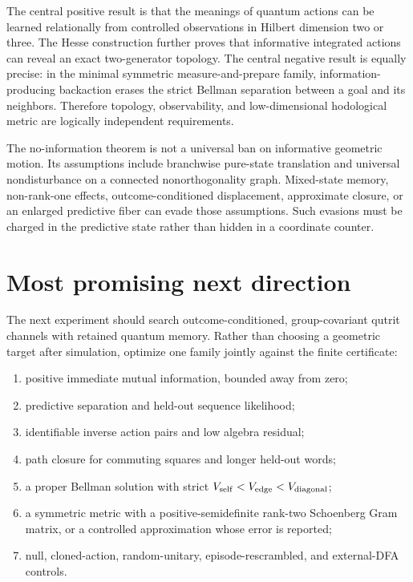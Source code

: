 \documentclass[11pt]{article}
\theoremstyle{definition}
\theoremstyle{remark}
\begin{document}
The central positive result is that the meanings of quantum actions can be
learned relationally from controlled observations in Hilbert dimension two or
three.  The Hesse construction further proves that informative integrated
actions can reveal an exact two-generator topology.  The central negative
result is equally precise: in the minimal symmetric measure-and-prepare
family, information-producing backaction erases the strict Bellman separation
between a goal and its neighbors.  Therefore topology, observability, and
low-dimensional hodological metric are logically independent requirements.

The no-information theorem is not a universal ban on informative geometric
motion.  Its assumptions include branchwise pure-state translation and
universal nondisturbance on a connected nonorthogonality graph.  Mixed-state
memory, non-rank-one effects, outcome-conditioned displacement, approximate
closure, or an enlarged predictive fiber can evade those assumptions.  Such
evasions must be charged in the predictive state rather than hidden in a
coordinate counter.

\section{Most promising next direction}

The next experiment should search outcome-conditioned, group-covariant qutrit
channels with retained quantum memory.  Rather than choosing a geometric
target after simulation, optimize one family jointly against the finite
certificate:
\begin{enumerate}
\item positive immediate mutual information, bounded away from zero;
\item predictive separation and held-out sequence likelihood;
\item identifiable inverse action pairs and low algebra residual;
\item path closure for commuting squares and longer held-out words;
\item a proper Bellman solution with strict
$V_{\rm self}<V_{\rm edge}<V_{\rm diagonal}$;
\item a symmetric metric with a positive-semidefinite rank-two Schoenberg
Gram matrix, or a controlled approximation whose error is reported;
\item null, cloned-action, random-unitary, episode-rescrambled, and external-DFA
controls.
\end{enumerate}
\end{document}
